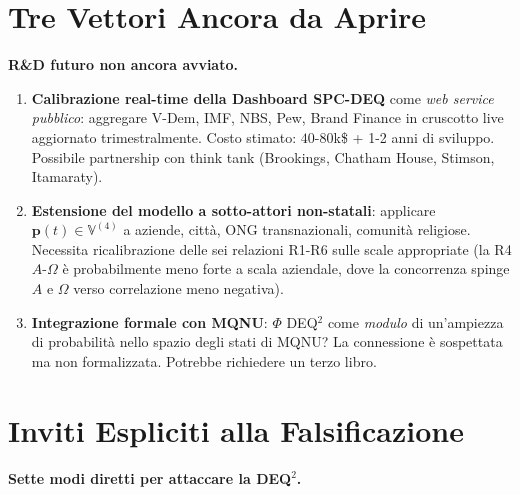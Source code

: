 \section{Tre Vettori Ancora da
Aprire}\label{tre-vettori-ancora-da-aprire}

\Hypoth{} \textbf{R\&D futuro non ancora avviato.}

\begin{enumerate}
\def\labelenumi{\arabic{enumi}.}
\tightlist
\item
  \textbf{Calibrazione real-time della Dashboard SPC-DEQ} come \emph{web
  service pubblico}: aggregare V-Dem, IMF, NBS, Pew, Brand Finance in
  cruscotto live aggiornato trimestralmente. Costo stimato:
  \(40\)-\(80\)k\$ + 1-2 anni di sviluppo. Possibile partnership con
  think tank (Brookings, Chatham House, Stimson, Itamaraty).
\item
  \textbf{Estensione del modello a sotto-attori non-statali}: applicare
  \(\boldsymbol{p}(t) \in \mathbb{V}^{(4)}\) a aziende, città, ONG
  transnazionali, comunità religiose. Necessita ricalibrazione delle sei
  relazioni R1-R6 sulle scale appropriate (la R4 \(A\)-\(\Omega\) è
  probabilmente meno forte a scala aziendale, dove la concorrenza spinge
  \(A\) e \(\Omega\) verso correlazione meno negativa).
\item
  \textbf{Integrazione formale con MQNU}: \(\Phi\) DEQ$^2$ come
  \emph{modulo} di un'ampiezza di probabilità nello spazio degli stati
  di MQNU? La connessione è sospettata ma non formalizzata. Potrebbe
  richiedere un terzo libro.
\end{enumerate}



\section{Inviti Espliciti alla
Falsificazione}\label{inviti-espliciti-alla-falsificazione}

\Hypoth{} \textbf{Sette modi diretti per attaccare la DEQ$^2$.}

